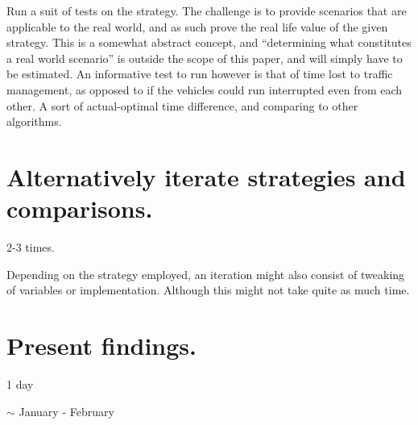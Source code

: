 \documentclass{article}
\begin{document}
    Run a suit of tests on the strategy. The challenge is to provide scenarios that are applicable to the real world, and as such prove the real life value of the given strategy. This is a somewhat abstract concept, and ``determining what constitutes a real world scenario'' is outside the scope of this paper, and will simply have to be estimated. An informative test to run however is that of time lost to traffic management, as opposed to if the vehicles could run interrupted even from each other. A sort of actual-optimal time difference, and comparing to other algorithms. 
    
    \section{Alternatively iterate strategies and comparisons.}
    2-3 times.
    
    Depending on the strategy employed, an iteration might also consist of tweaking of variables or implementation. Although this might not take quite as much time. 
    
    \section{Present findings.}
    1 day
    
    $\sim$ January - February
    
\end{document}
